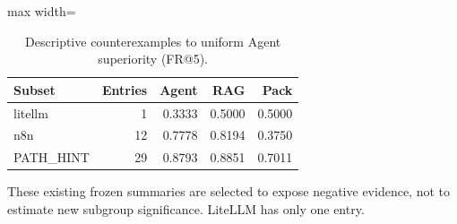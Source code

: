 \begin{table}[t]
\centering
\caption{Descriptive counterexamples to uniform Agent superiority (FR@5).}\label{tab:negative}
\small
\begin{adjustbox}{max width=\columnwidth}\begin{tabular}{lrrrr}
\toprule
Subset & Entries & Agent & RAG & Pack \\
\midrule
litellm & 1 & 0.3333 & 0.5000 & 0.5000 \\
n8n & 12 & 0.7778 & 0.8194 & 0.3750 \\
PATH\_HINT & 29 & 0.8793 & 0.8851 & 0.7011 \\
\bottomrule
\end{tabular}\end{adjustbox}
\par\vspace{2pt}\begin{minipage}{\columnwidth}\footnotesize These existing frozen summaries are selected to expose negative evidence, not to estimate new subgroup significance. LiteLLM has only one entry.\end{minipage}
\end{table}

